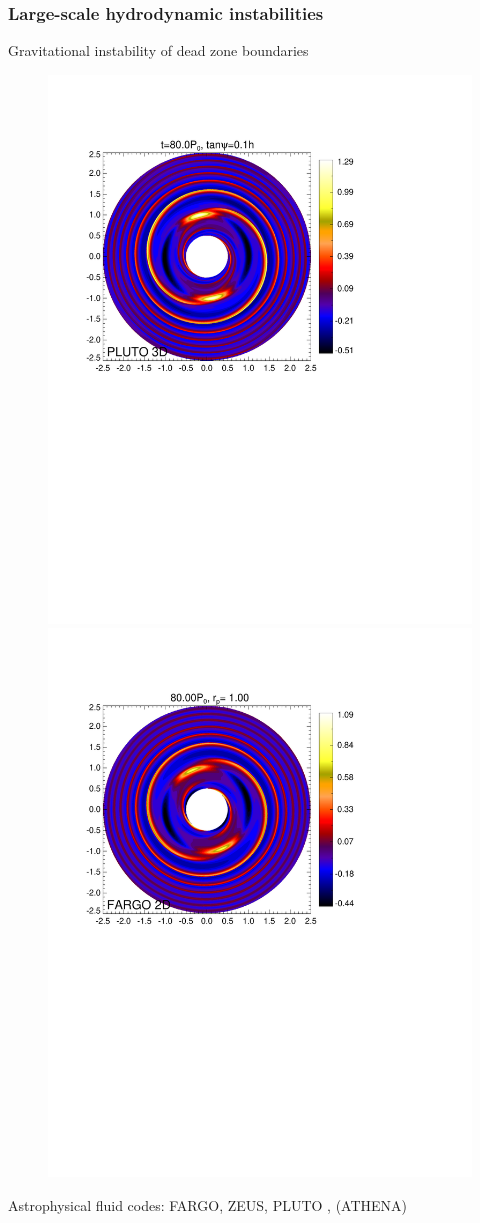 \documentclass[10pt]{beamer}
\begin{document}
\begin{frame}
   \frametitle{Large-scale hydrodynamic instabilities}
    \centering
    \begin{onlinebox}{9cm} Gravitational instability
      of dead zone boundaries\end{onlinebox}
   \begin{figure}
     \includegraphics[width=0.48\linewidth,clip=true,trim=1.9cm
       12.75cm 5.9cm 3.3cm]{pdiskxy_008.pdf}\includegraphics[width=0.48\linewidth,clip=true,trim=1.9cm
       12.75cm 5.9cm 3.3cm]{polarxy2_dens008.pdf}
   \end{figure} 
   Astrophysical fluid codes: FARGO, ZEUS, PLUTO , (ATHENA)
\end{frame}
\end{document}
